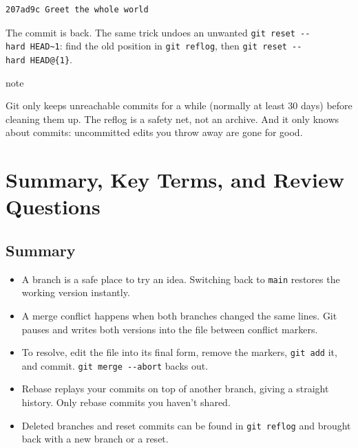 \begin{codeblock}

\begin{Shaded}
\begin{Highlighting}[]
 
\end{Highlighting}
\end{Shaded}

\end{codeblock}

\begin{codeblock}
\begin{Verbatim}[formatcom=\outputstyle]
207ad9c Greet the whole world
\end{Verbatim}
\end{codeblock}

The commit is back. The same trick undoes an unwanted \texttt{git\ reset\ -\/-hard\ HEAD\textasciitilde{}1}: find the old position in \texttt{git\ reflog}, then \texttt{git\ reset\ -}\allowbreak{}\texttt{-}\allowbreak{}\texttt{hard\ HEAD@\{1\}}.

\begin{callout}{note}

Git only keeps unreachable commits for a while (normally at least 30 days) before cleaning them up. The reflog is a safety net, not an archive. And it only knows about commits: uncommitted edits you throw away are gone for good.

\end{callout}

\section{Summary, Key Terms, and Review Questions}\label{10-lab-try-an-idea-without-breaking-anything:summary-key-terms-and-review-questions}

\subsection*{Summary}\label{10-lab-try-an-idea-without-breaking-anything:summary}

\begin{itemize}
\tightlist
\item
  A branch is a safe place to try an idea. Switching back to \texttt{main} restores the working version instantly.
\item
  A merge conflict happens when both branches changed the same lines. Git pauses and writes both versions into the file between conflict markers.
\item
  To resolve, edit the file into its final form, remove the markers, \texttt{git\ add} it, and commit. \texttt{git\ merge\ -\/-abort} backs out.
\item
  Rebase replays your commits on top of another branch, giving a straight history. Only rebase commits you haven't shared.
\item
  Deleted branches and reset commits can be found in \texttt{git\ reflog} and brought back with a new branch or a reset.
\end{itemize}

